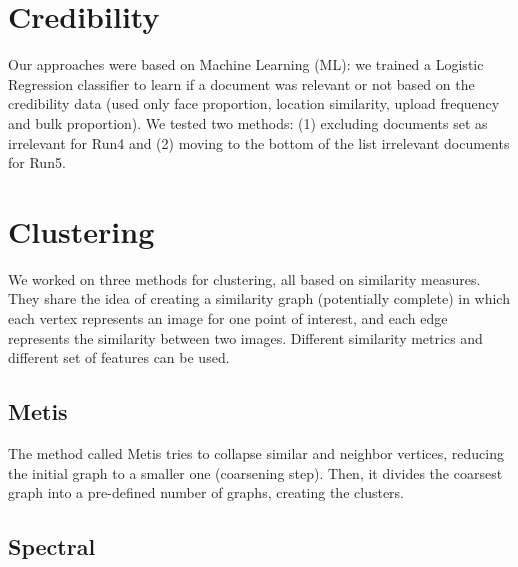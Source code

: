 \documentclass[a0,portrait]{a0poster}
\begin{document}
\begin{multicols}{2}
\color{Navy} %
\section*{Credibility}
\color{DarkSlateGray} %

Our approaches were based on Machine Learning (ML):
we trained a Logistic Regression classifier to learn if a document was relevant or not based on the credibility data (used
only face proportion, location similarity, upload frequency
and bulk proportion). We tested two methods: (1) excluding documents set as irrelevant for Run4 and (2) moving to
the bottom of the list irrelevant documents for Run5.


\color{Navy} %
\section*{Clustering}
\color{DarkSlateGray} %

We worked on three methods for clustering, all based on similarity measures.
They share the idea of creating a similarity graph (potentially complete) in which each vertex represents an image for one point of interest, and
each edge represents the similarity between two images. Different similarity metrics and different set of features can be used.

\vspace{-0.4cm}
\subsection*{Metis}
\vspace{-0.8cm}

The method called Metis tries to collapse similar and neighbor vertices, reducing the initial graph to a smaller one (coarsening step).
Then, it divides the coarsest graph into a pre-defined number of graphs, creating the clusters.  

\vspace{-0.4cm}
\subsection*{Spectral}
\vspace{-0.8cm}


\end{multicols}
\end{document}
